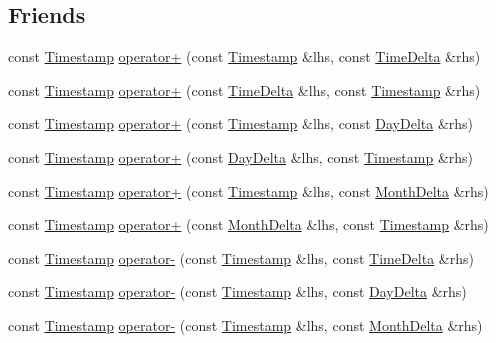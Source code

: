 \subsection*{Friends}
\begin{DoxyCompactItemize}
\item 
const \hyperlink{structTimestamp}{Timestamp} \hyperlink{structTimestamp_a5eb71bec7edce3a62bfc8ad803217d81}{operator+} (const \hyperlink{structTimestamp}{Timestamp} \&lhs, const \hyperlink{structTimeDelta}{Time\-Delta} \&rhs)
\item 
const \hyperlink{structTimestamp}{Timestamp} \hyperlink{structTimestamp_afd358fc0636aff7726ab1e4de62996b1}{operator+} (const \hyperlink{structTimeDelta}{Time\-Delta} \&lhs, const \hyperlink{structTimestamp}{Timestamp} \&rhs)
\item 
const \hyperlink{structTimestamp}{Timestamp} \hyperlink{structTimestamp_a4d4956a556c01ac7b2d80f2c6ad92169}{operator+} (const \hyperlink{structTimestamp}{Timestamp} \&lhs, const \hyperlink{structDayDelta}{Day\-Delta} \&rhs)
\item 
const \hyperlink{structTimestamp}{Timestamp} \hyperlink{structTimestamp_a4f128e0c1107521f675cb6abe80d59be}{operator+} (const \hyperlink{structDayDelta}{Day\-Delta} \&lhs, const \hyperlink{structTimestamp}{Timestamp} \&rhs)
\item 
const \hyperlink{structTimestamp}{Timestamp} \hyperlink{structTimestamp_a7c3166a1ae2467926edcf656bbb70e6a}{operator+} (const \hyperlink{structTimestamp}{Timestamp} \&lhs, const \hyperlink{structMonthDelta}{Month\-Delta} \&rhs)
\item 
const \hyperlink{structTimestamp}{Timestamp} \hyperlink{structTimestamp_a6e9c1b339f7e957af5e04a6dbf060d73}{operator+} (const \hyperlink{structMonthDelta}{Month\-Delta} \&lhs, const \hyperlink{structTimestamp}{Timestamp} \&rhs)
\item 
const \hyperlink{structTimestamp}{Timestamp} \hyperlink{structTimestamp_abcd43fa9dc1d93330d1145200de6304f}{operator-\/} (const \hyperlink{structTimestamp}{Timestamp} \&lhs, const \hyperlink{structTimeDelta}{Time\-Delta} \&rhs)
\item 
const \hyperlink{structTimestamp}{Timestamp} \hyperlink{structTimestamp_a04c185ab523199b38a5bdaeaab34fd2b}{operator-\/} (const \hyperlink{structTimestamp}{Timestamp} \&lhs, const \hyperlink{structDayDelta}{Day\-Delta} \&rhs)
\item 
const \hyperlink{structTimestamp}{Timestamp} \hyperlink{structTimestamp_abfaf8665e29b7253bd93d567065f09f6}{operator-\/} (const \hyperlink{structTimestamp}{Timestamp} \&lhs, const \hyperlink{structMonthDelta}{Month\-Delta} \&rhs)

\end{DoxyCompactItemize}
